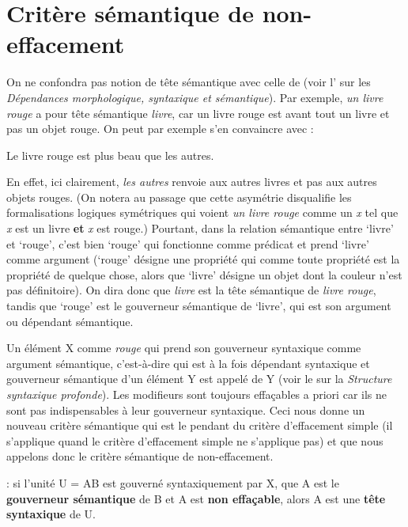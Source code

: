 \section{Critère sémantique de non-effacement}\label{sec:3.3.18}

On ne confondra pas notion de tête sémantique avec celle de  (voir l’ sur les \textit{Dépendances morphologique, syntaxique et sémantique}). Par exemple, \textit{un livre rouge} a pour tête sémantique \textit{livre}, car un livre rouge est avant tout un livre et pas un objet rouge. On peut par exemple s’en convaincre avec :

\ea
    {Le livre rouge est plus beau que les autres.}
\z

En effet, ici clairement, \textit{les autres} renvoie aux autres livres et pas aux autres objets rouges. (On notera au passage que cette asymétrie disqualifie les formalisations logiques symétriques qui voient \textit{un livre rouge} comme un \textit{x} tel que \textit{x} est un livre \textbf{et} \textit{x} est rouge.) Pourtant, dans la relation sémantique entre ‘livre’ et ‘rouge’, c’est bien ‘rouge’ qui fonctionne comme prédicat et prend ‘livre’ comme argument (‘rouge’ désigne une propriété qui comme toute propriété est la propriété de quelque chose, alors que ‘livre’ désigne un objet dont la couleur n’est pas définitoire). On dira donc que \textit{livre} est la tête sémantique de \textit{livre rouge}, tandis que ‘rouge’ est le gouverneur sémantique de ‘livre’, qui est son argument ou dépendant sémantique.

Un élément X comme \textit{rouge} qui prend son gouverneur syntaxique comme argument sémantique, c’est-à-dire qui est à la fois dépendant syntaxique et gouverneur sémantique d’un élément Y est appelé  de Y (voir le  sur la \textit{Structure syntaxique profonde}). Les modifieurs sont toujours effaçables a priori car ils ne sont pas indispensables à leur gouverneur syntaxique. Ceci nous donne un nouveau critère sémantique qui est le pendant du critère d’effacement simple (il s’applique quand le critère d’effacement simple ne s’applique pas) et que nous appelons donc le critère sémantique de non-effacement.

\begin{styleLivreImportant}
: si l’unité U = AB est gouverné syntaxiquement par X, que A est le \textbf{gouverneur sémantique} de B et A est \textbf{non effaçable}, alors A est une \textbf{tête syntaxique} de U.
\end{styleLivreImportant}

